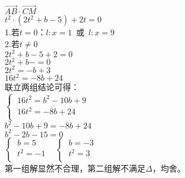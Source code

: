 \documentclass[UTF8]{ctexart}
\begin{document}
\begin{multicols}{2}
        $\overrightarrow{AB}\cdot\overrightarrow{CM}$\\[5mm]
        $t^2\cdot\left(2t^2+b-5\right)+2t=0$\\[5mm]
        1.若$t=0$：$l:x=1$~或~$l:x=9$\\[5mm]
        2.若$t\neq 0$\\[5mm]
        $2t^2+b-5+2=0$\\[5mm]
        $2t^2+b-=0$\\[5mm]
        $2t^2=-b+3$\\[5mm]
        $16t^2=-8b+24$\\[8mm]
        联立两组结论可得：\\[5mm]
        \begin{math}
            \begin{cases}
                ~16t^2=b^2-10b+9\\[1mm]
                ~16t^2=-8b+24\\[1mm]
            \end{cases}
        \end{math}\\[5mm]
        $b^2-10b+9=-8b+24$\\[5mm]
        $b^2-2b-15=0$\\[5mm]
        \begin{math}
            \begin{cases}
                ~b=5\\[1mm]
                ~t^2=-1\\[1mm]
            \end{cases}~~~~
            \begin{cases}
                ~b=-3\\[1mm]
                ~t^2=3\\[1mm]
            \end{cases}
        \end{math}\\[5mm]
        第一组解显然不合理，第二组解不满足$\Delta$，均舍。
        \newpage
    \end{multicols}   

\newpage
\end{document}
